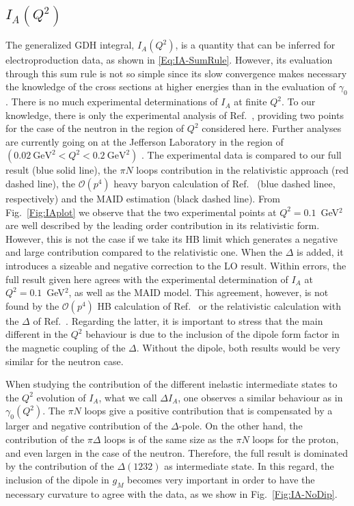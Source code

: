 \documentclass[prc,twocolumn,showpacs,preprintnumbers,amsmath,amssymb
,superscriptaddress,a4paper,nofootinbib
]{revtex4-1}
\begin{document}
\subsection{$I_A(Q^2)$}

The generalized GDH integral, $I_A(Q^2)$, is a quantity that can be inferred for electroproduction data, as shown in \eqref{Eq:IA-SumRule}. 
However, its evaluation through this sum rule is not so simple since its slow convergence makes necessary the knowledge of the cross sections at higher energies than in the evaluation of $\gamma_0$.
There is no much experimental determinations of $I_A$ at finite $Q^2$.
To our knowledge, there is only the experimental analysis of Ref.~\cite{Amarian:2002ar}, providing two points for the case of the neutron in the region of $Q^2$ considered here.
Further analyses are currently going on at the Jefferson Laboratory in the region of $(0.02~\text{GeV}^2<Q^2<0.2~\text{GeV}^2)$ \cite{Exp-new-E08-027,Exp-new-E97-110}.
The experimental data is compared to our full result (blue solid line), the $\pi N$ loops contribution in the relativistic approach (red dashed line), the $\mathcal{O}(p^4)$ heavy baryon calculation of Ref.~\cite{Kao:2003jd} (blue dashed linee, respectively) and the MAID estimation (black dashed line).
From Fig.~\ref{Fig:IAplot} we observe that the two experimental points at $Q^2=0.1$~GeV$^2$ are well described by the leading order contribution in its relativistic form. 
However, this is not the case if we take its HB limit which generates a negative and large contribution compared to the relativistic one.
When the $\Delta$ is added, it introduces a sizeable and negative correction to the LO result.
Within errors, the full result given here agrees with the experimental determination of $I_A$ at $Q^2=0.1$~GeV$^2$, as well as the MAID model. 
This agreement, however, is not found by the $\mathcal{O}(p^4)$ HB calculation of Ref.~\cite{Kao:2002cp} or the relativistic calculation with the $\Delta$ of Ref.~\cite{Bernard:2012hb}.
Regarding the latter, it is important to stress that the main different in the $Q^2$ behaviour is due to the inclusion of the dipole form factor in the magnetic coupling of the $\Delta$.
Without the dipole, both results would be very similar for the neutron case.

When studying the contribution of the different inelastic intermediate states to the $Q^2$ evolution of $I_A$, what we call $\Delta I_A$, one observes a similar behaviour as in $\gamma_0(Q^2)$. 
The $\pi N$ loops give a positive contribution that is compensated by a larger and negative contribution of the $\Delta$-pole.
On the other hand, the contribution of the $\pi \Delta$ loops is of the same size as the $\pi N$ loops for the proton, and even largen in the case of the neutron. 
Therefore, the full result is dominated by the contribution of the $\Delta(1232)$ as intermediate state.
In this regard, the inclusion of the dipole in $g_M$ becomes very important in order to have the necessary curvature to agree with the data, as we show in Fig.~\ref{Fig:IA-NoDip}.
\end{document}

